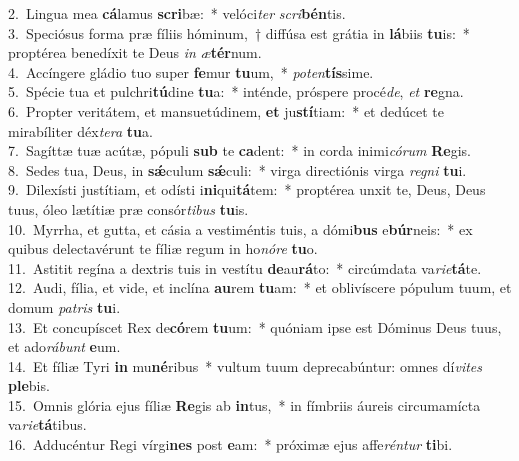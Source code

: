 {2.~}Lingua mea \textbf{cá}lamus \textbf{scri}bæ:~* velóci\textit{ter} \textit{scri}\textbf{bén}tis.\\
{3.~}Speciósus forma præ fíliis hóminum,~† diffúsa est grátia in \textbf{lá}biis \textbf{tu}is:~* proptérea benedíxit te Deus \textit{in} \textit{æ}\textbf{tér}num.\\
{4.~}Accíngere gládio tuo super \textbf{fe}mur \textbf{tu}um,~* \textit{po}\textit{ten}\textbf{tís}sime.\\
{5.~}Spécie tua et pulchri\textbf{tú}dine \textbf{tu}a:~* inténde, próspere procé\textit{de}, \textit{et} \textbf{re}gna.\\
{6.~}Propter veritátem, et mansuetúdinem, \textbf{et} ju\textbf{stí}tiam:~* et dedúcet te mirabíliter déx\textit{te}\textit{ra} \textbf{tu}a.\\
{7.~}Sagíttæ tuæ acútæ, pópuli \textbf{sub} te \textbf{ca}dent:~* in corda inimi\textit{có}\textit{rum} \textbf{Re}gis.\\
{8.~}Sedes tua, Deus, in \textbf{sǽ}culum \textbf{sǽ}culi:~* virga directiónis virga \textit{re}\textit{gni} \textbf{tu}i.\\
{9.~}Dilexísti justítiam, et odísti i\textbf{ni}qui\textbf{tá}tem:~* proptérea unxit te, Deus, Deus tuus, óleo lætítiæ præ consór\textit{ti}\textit{bus} \textbf{tu}is.\\
{10.~}Myrrha, et gutta, et cásia a vestiméntis tuis, a dómi\textbf{bus} e\textbf{búr}neis:~* ex quibus delectavérunt te fíliæ regum in ho\textit{nó}\textit{re} \textbf{tu}o.\\
{11.~}Astitit regína a dextris tuis in vestítu \textbf{de}au\textbf{rá}to:~* circúmdata va\textit{ri}\textit{e}\textbf{tá}te.\\
{12.~}Audi, fília, et vide, et inclína \textbf{au}rem \textbf{tu}am:~* et oblivíscere pópulum tuum, et domum \textit{pa}\textit{tris} \textbf{tu}i.\\
{13.~}Et concupíscet Rex de\textbf{có}rem \textbf{tu}um:~* quóniam ipse est Dóminus Deus tuus, et ado\textit{rá}\textit{bunt} \textbf{e}um.\\
{14.~}Et fíliæ Tyri \textbf{in} mu\textbf{né}ribus~* vultum tuum deprecabúntur: omnes dí\textit{vi}\textit{tes} \textbf{ple}bis.\\
{15.~}Omnis glória ejus fíliæ \textbf{Re}gis ab \textbf{in}tus,~* in fímbriis áureis circumamícta va\textit{ri}\textit{e}\textbf{tá}tibus.\\
{16.~}Adducéntur Regi vírgi\textbf{nes} post \textbf{e}am:~* próximæ ejus affe\textit{rén}\textit{tur} \textbf{ti}bi.\\
